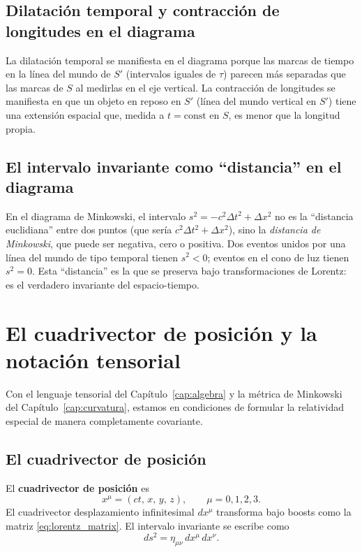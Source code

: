 \subsection{Dilatación temporal y contracción de longitudes en el diagrama}

La dilatación temporal se manifiesta en el diagrama porque las marcas de tiempo en la línea del mundo de $S'$ (intervalos iguales de $\tau$) parecen más separadas que las marcas de $S$ al medirlas en el eje vertical. La contracción de longitudes se manifiesta en que un objeto en reposo en $S'$ (línea del mundo vertical en $S'$) tiene una extensión espacial que, medida a $t = \mathrm{const}$ en $S$, es menor que la longitud propia.

\subsection{El intervalo invariante como ``distancia'' en el diagrama}

\begin{importante}
En el diagrama de Minkowski, el intervalo $s^2 = -c^2\Delta t^2 + \Delta x^2$ no es la ``distancia euclidiana'' entre dos puntos (que sería $c^2\Delta t^2 + \Delta x^2$), sino la \emph{distancia de Minkowski}, que puede ser negativa, cero o positiva. Dos eventos unidos por una línea del mundo de tipo temporal tienen $s^2 < 0$; eventos en el cono de luz tienen $s^2 = 0$. Esta ``distancia'' es la que se preserva bajo transformaciones de Lorentz: es el verdadero invariante del espacio-tiempo.
\end{importante}

\section{El cuadrivector de posición y la notación tensorial}

Con el lenguaje tensorial del Capítulo~\ref{cap:algebra} y la métrica de Minkowski del Capítulo~\ref{cap:curvatura}, estamos en condiciones de formular la relatividad especial de manera completamente covariante.

\subsection{El cuadrivector de posición}

El \textbf{cuadrivector de posición} es
\begin{equation}
  x^\mu = (ct,\, x,\, y,\, z), \qquad \mu = 0,1,2,3.
  \label{eq:cuadripos}
\end{equation}
El cuadrivector desplazamiento infinitesimal $dx^\mu$ transforma bajo boosts como la matriz \eqref{eq:lorentz_matrix}. El intervalo invariante se escribe como
\[
  ds^2 = \eta_{\mu\nu}\, dx^\mu\, dx^\nu.
\]

